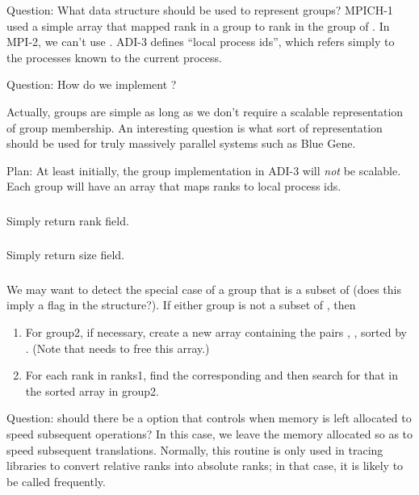\documentclass{article}
\begin{document}
Question: What data structure should be used to represent groups?
MPICH-1 used a simple array that mapped rank in a group to rank in the
group of .  In MPI-2, we can't use
.  ADI-3 defines ``local process ids'', which
refers simply to the processes known to the current process.

Question: How do we implement ?

Actually, groups are simple as long as we don't require a scalable
representation of group membership.  An interesting question is what
sort of representation should be used for truly massively parallel
systems such as Blue Gene.  

Plan: At least initially, the group implementation in ADI-3 will \emph{not} be
scalable.  Each group will have an array that maps ranks to local process ids.

\subsubsection{}
Simply return rank field.
\subsubsection{}
Simply return size field.

\subsubsection{}
We may want to detect the special case of a group that is a subset of
 (does this imply a flag in the 
structure?).  
If either group is not a subset of , then 
\begin{enumerate}
\item For group2, if necessary, create a new array containing the pairs
  , , sorted by . (Note that  needs to free this array.)
\item For each rank in ranks1, find the corresponding 
  and then search for that in the sorted array in group2.  
\end{enumerate}
Question: should there be a  option that controls when
memory is left allocated to speed subsequent operations?  In this case, we
leave the memory allocated so as to speed subsequent translations.  Normally,
this routine is only used in tracing libraries to convert relative ranks into
absolute ranks; in that case, it is likely to be called frequently.
\end{document}
